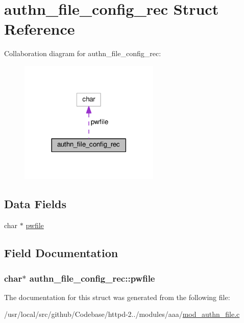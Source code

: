 \hypertarget{structauthn__file__config__rec}{}\section{authn\+\_\+file\+\_\+config\+\_\+rec Struct Reference}
\label{structauthn__file__config__rec}


Collaboration diagram for authn\+\_\+file\+\_\+config\+\_\+rec\+:
\nopagebreak
\begin{figure}[H]
\begin{center}
\leavevmode
\includegraphics[width=189pt]{structauthn__file__config__rec__coll__graph}
\end{center}
\end{figure}
\subsection*{Data Fields}
\begin{DoxyCompactItemize}
\item 
char $\ast$ \hyperlink{structauthn__file__config__rec_a080441cc8d376e4a8f4bdba51b850449}{pwfile}
\end{DoxyCompactItemize}


\subsection{Field Documentation}
\subsubsection[{\texorpdfstring{pwfile}{pwfile}}]{\setlength{\rightskip}{0pt plus 5cm}char$\ast$ authn\+\_\+file\+\_\+config\+\_\+rec\+::pwfile}\hypertarget{structauthn__file__config__rec_a080441cc8d376e4a8f4bdba51b850449}{}\label{structauthn__file__config__rec_a080441cc8d376e4a8f4bdba51b850449}


The documentation for this struct was generated from the following file\+:\begin{DoxyCompactItemize}
\item 
/usr/local/src/github/\+Codebase/httpd-\/2../modules/aaa/\hyperlink{mod__authn__file_8c}{mod\+\_\+authn\+\_\+file.\+c}\end{DoxyCompactItemize}

